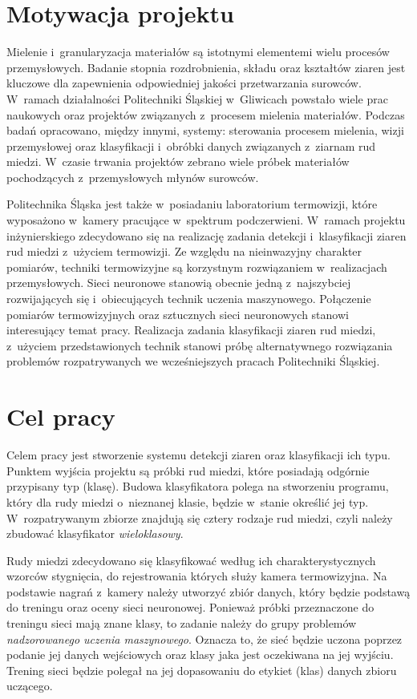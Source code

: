 \section{Motywacja projektu}
Mielenie i~granularyzacja materiałów są istotnymi elementemi wielu procesów
przemysłowych.
Badanie stopnia rozdrobnienia, składu oraz kształtów ziaren jest kluczowe
dla zapewnienia odpowiedniej jakości przetwarzania surowców.
W~ramach działalności Politechniki Śląskiej w~Gliwicach powstało wiele prac
naukowych oraz projektów związanych z~procesem mielenia materiałów.
Podczas badań opracowano, między innymi, systemy: sterowania
procesem mielenia, wizji przemysłowej oraz klasyfikacji i~obróbki
danych związanych z~ziarnam rud miedzi.
W~czasie trwania projektów zebrano wiele próbek materiałów pochodzących
z~przemysłowych młynów surowców.

Politechnika Śląska jest także w~posiadaniu laboratorium termowizji, które
wyposażono w~kamery pracujące w~spektrum podczerwieni.
W~ramach projektu inżynierskiego zdecydowano się na realizację zadania
detekcji i~klasyfikacji ziaren rud miedzi z~użyciem termowizji.
Ze względu na nieinwazyjny charakter pomiarów, techniki termowizyjne są
korzystnym rozwiązaniem w~realizacjach przemysłowych.
Sieci neuronowe stanowią obecnie jedną z~najszybciej rozwijających się
i~obiecujących technik uczenia maszynowego.
Połączenie pomiarów termowizyjnych oraz sztucznych sieci neuronowych
stanowi interesujący temat pracy.
Realizacja zadania klasyfikacji ziaren rud miedzi, z~użyciem przedstawionych
technik stanowi próbę alternatywnego rozwiązania problemów rozpatrywanych
we wcześniejszych pracach Politechniki Śląskiej.

\section{Cel pracy}
Celem pracy jest stworzenie systemu detekcji ziaren oraz klasyfikacji ich
typu.
Punktem wyjścia projektu są próbki rud miedzi, które posiadają odgórnie
przypisany typ (klasę).
Budowa klasyfikatora polega na stworzeniu programu, który
dla rudy miedzi o~nieznanej klasie, będzie w~stanie określić jej typ.
W~rozpatrywanym zbiorze znajdują się cztery rodzaje rud miedzi, czyli
należy zbudować klasyfikator \emph{wieloklasowy}.

Rudy miedzi zdecydowano się klasyfikować według ich charakterystycznych
wzorców stygnięcia, do rejestrowania których służy kamera termowizyjna.
Na podstawie nagrań z~kamery należy utworzyć zbiór danych, który będzie
podstawą do treningu oraz oceny sieci neuronowej.
Ponieważ próbki przeznaczone do treningu sieci mają znane klasy, 
to zadanie należy do grupy problemów \emph{nadzorowanego uczenia maszynowego}.
Oznacza to, że sieć będzie uczona poprzez podanie jej danych wejściowych
oraz klasy jaka jest oczekiwana na jej wyjściu.
Trening sieci będzie polegał na jej dopasowaniu do etykiet (klas) danych
zbioru uczącego.

